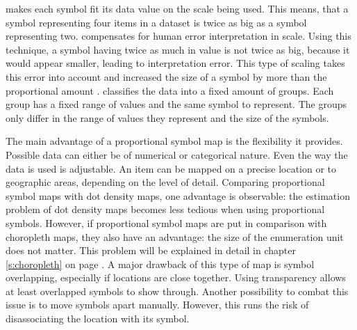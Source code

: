 \begin{enumerate}
 makes each symbol fit its data value on the scale being used. This means, that a symbol representing four items in a dataset is twice as big as a symbol representing two.
 compensates for human error interpretation in scale. Using this technique, a symbol having twice as much in value is not twice as big, because it would appear smaller, leading to interpretation error. This type of scaling takes this error into account and increased the size of a symbol by more than the proportional amount .
 classifies the data into a fixed amount of groups. Each group has a fixed range of values and the same symbol to represent. The groups only differ in the range of values they represent and the size of the symbols.
\end{enumerate}

The main advantage of a proportional symbol map is the flexibility it provides. Possible data can either be of numerical or categorical nature. Even the way the data is used is adjustable. An item can be mapped on a precise location or to geographic areas, depending on the level of detail.
Comparing proportional symbol maps with dot density maps, one advantage is observable: the estimation problem of dot density maps becomes less tedious when using proportional symbols. However, if proportional symbol maps are put in comparison with choropleth maps, they also have an advantage: the size of the enumeration unit does not matter. This problem will be explained in detail in chapter \ref{s:choropleth} on page \pageref{s:choropleth}.
A major drawback of this type of map is symbol overlapping, especially if locations are close together. Using transparency allows at least overlapped symbols to show through. Another possibility to combat this issue is to move symbols apart manually. However, this runs the risk of disassociating the location with its symbol.